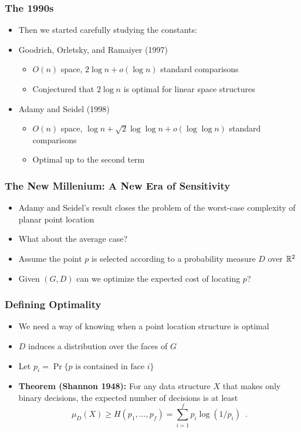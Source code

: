 \documentclass{beamer}
\begin{document}
\frame
{
  \frametitle{The 1990s}
  \begin{itemize}
  \item<1-> Then we started carefully studying the constants:
   \item<2-> Goodrich, Orletsky, and Ramaiyer (1997)
   \begin{itemize}
      \item<3-> $O(n)$ space, $2\log n + o(\log n)$ standard comparisons
      \item<4-> Conjectured that $2\log n$ is optimal for linear space structures
   \end{itemize}
   \item<5-> Adamy and Seidel (1998)
   \begin{itemize}
      \item<6-> $O(n)$ space, $\log n + \sqrt{2}\log\log n +
o(\log\log n)$ standard comparisons
      \item<7-> Optimal up to the second term
   \end{itemize}
  \end{itemize}
}

\frame
{
  \frametitle{The New Millenium: A New Era of Sensitivity}
  \begin{itemize}
  \item<1-> Adamy and Seidel's result closes the problem of the
	worst-case complexity of planar point location
  \item<2-> What about the average case?
  \item<3-> Assume the point $p$ is selected according to a
	probability measure $D$ over $\mathbb{R}^2$
  \item<4-> Given $(G,D)$ can we optimize the expected cost of
	locating $p$?
  \end{itemize}
}

\frame
{
  \frametitle{Defining Optimality}
  \begin{itemize}
   \item<1-> We need a way of knowing when a point location structure
	is optimal
   \item<2-> $D$ induces a distribution over the faces of $G$
   \item<3-> Let $p_i=\Pr\{\mbox{$p$ is contained in face $i$}\}$
   \item<4-> \textbf{Theorem (Shannon 1948):}
     For any data structure $X$ that makes only binary decisions, the
expected number of decisions is at least
   \[
      \mu_D(X) \ge H(p_1,\ldots,p_f) = \sum_{i=1}^f p_i\log(1/p_i)  \enspace .
   \]
  \end{itemize}
}
\end{document}
